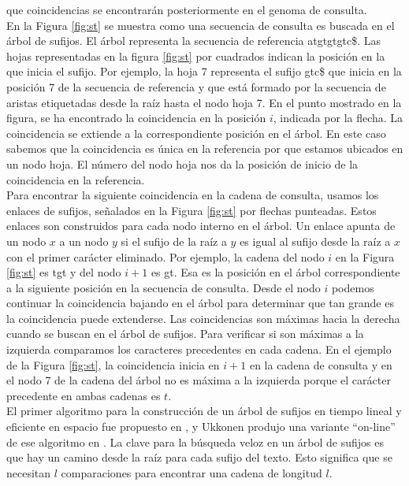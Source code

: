 \documentclass[12pt,a4paper]{article}
\begin{document}
que coincidencias se encontrarán posteriormente en el genoma de consulta.\\
\indent
En la Figura \ref{fig:st} se muestra como una secuencia de consulta es buscada en el árbol de sufijos. El
árbol representa la secuencia de referencia atgtgtgtc\$. Las hojas representadas en la figura \ref{fig:st} por cuadrados indican la
posición en la que inicia el sufijo. Por ejemplo, la hoja 7 representa el sufijo gtc\$ que inicia en la 
posición 7 de la secuencia de referencia y que está formado por la secuencia de aristas etiquetadas desde la
raíz hasta el nodo hoja 7. En el punto mostrado en la figura, se ha encontrado la coincidencia en la posición $i$,
indicada por la flecha. La coincidencia se extiende a la correspondiente posición en el árbol. En este caso sabemos
que la coincidencia es única en la referencia por que estamos ubicados en un nodo hoja. El número del nodo hoja
nos da la posición de inicio de la coincidencia en la referencia.\\
\indent
Para encontrar la siguiente coincidencia en la cadena de consulta, usamos los enlaces de sufijos, señalados en la Figura \ref{fig:st} por
flechas punteadas. Estos enlaces son construidos para cada nodo interno en el árbol. Un enlace apunta de un nodo
$x$ a un nodo $y$ si el sufijo de la raíz a $y$ es igual al sufijo desde la raíz a $x$ con el primer carácter 
eliminado. Por ejemplo, la cadena del nodo $i$ en la Figura \ref{fig:st} es tgt y del nodo $i+1$ es gt. Esa es la
posición en el árbol correspondiente a la siguiente posición en la secuencia de consulta. Desde el nodo $i$ podemos
continuar la coincidencia bajando en el árbol para determinar que tan grande es la coincidencia puede extenderse. Las 
coincidencias son máximas hacia la derecha cuando se buscan en el árbol de sufijos. Para verificar si son máximas a
la izquierda comparamos los caracteres precedentes en cada cadena. En el ejemplo de la Figura \ref{fig:st}, la
coincidencia inicia en $i+1$ en la cadena de consulta y en el nodo 7 de la cadena del árbol no es máxima a la izquierda
porque el carácter precedente en ambas cadenas es $t$.\\
\indent
El primer algoritmo para la construcción de un árbol de sufijos en tiempo lineal 
y eficiente en espacio fue propuesto en \cite{McCreight:1976:SST:321941.321946}
, y Ukkonen produjo una variante ``on-line'' de ese algoritmo en \cite{Ukkonen1992}. 
La clave para la búsqueda veloz en un árbol de sufijos es que 
hay un camino desde la raíz para cada sufijo del texto. Esto significa que se 
necesitan $l$ comparaciones para encontrar una cadena de longitud $l$.\\
\end{document}
